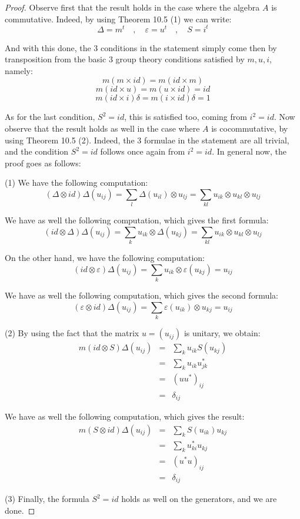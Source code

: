 \documentclass[12pt]{amsbook}
\begin{document}
\begin{proof}
Observe first that the result holds in the case where the algebra $A$ is commutative. Indeed, by using Theorem 10.5 (1) we can write:
$$\Delta=m^t\quad,\quad 
\varepsilon=u^t\quad,\quad
S=i^t$$

And with this done, the 3 conditions in the statement simply come then by transposition from the basic 3 group theory conditions satisfied by $m,u,i$, namely:
$$m(m\times id)=m(id\times m)$$
$$m(id\times u)=m(u\times id)=id$$
$$m(id\times i)\delta=m(i\times id)\delta=1$$

As for the last condition, $S^2=id$, this is satisfied too, coming from $i^2=id$. Now observe that the result holds as well in the case where $A$ is cocommutative, by using Theorem 10.5 (2). Indeed, the 3 formulae in the statement are all trivial, and the condition $S^2=id$ follows once again from $i^2=id$. In general now, the proof goes as follows:

\medskip

(1) We have the following computation:
$$(\Delta\otimes id)\Delta(u_{ij})
=\sum_l\Delta(u_{il})\otimes u_{lj}
=\sum_{kl}u_{ik}\otimes u_{kl}\otimes u_{lj}$$

We have as well the following computation, which gives the first formula:
$$(id\otimes\Delta)\Delta(u_{ij})
=\sum_ku_{ik}\otimes\Delta(u_{kj})
=\sum_{kl}u_{ik}\otimes u_{kl}\otimes u_{lj}$$

On the other hand, we have the following computation:
$$(id\otimes\varepsilon)\Delta(u_{ij})
=\sum_ku_{ik}\otimes\varepsilon(u_{kj})
=u_{ij}$$

We have as well the following computation, which gives the second formula:
$$(\varepsilon\otimes id)\Delta(u_{ij})
=\sum_k\varepsilon(u_{ik})\otimes u_{kj}
=u_{ij}$$

(2) By using the fact that the matrix $u=(u_{ij})$ is unitary, we obtain:
\begin{eqnarray*}
m(id\otimes S)\Delta(u_{ij})
&=&\sum_ku_{ik}S(u_{kj})\\
&=&\sum_ku_{ik}u_{jk}^*\\
&=&(uu^*)_{ij}\\
&=&\delta_{ij}
\end{eqnarray*}

We have as well the following computation, which gives the result:
\begin{eqnarray*}
m(S\otimes id)\Delta(u_{ij})
&=&\sum_kS(u_{ik})u_{kj}\\
&=&\sum_ku_{ki}^*u_{kj}\\
&=&(u^*u)_{ij}\\
&=&\delta_{ij}
\end{eqnarray*}

(3) Finally, the formula $S^2=id$ holds as well on the generators, and we are done.
\end{proof}
\end{document}
